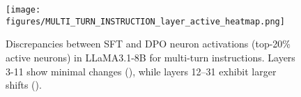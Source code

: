 
\begin{figure}[t]
    \centering
    \texttt{[image: figures/MULTI\_TURN\_INSTRUCTION\_layer\_active\_heatmap.png]}
    \vspace{-3mm}
    \caption{\small Discrepancies between SFT and DPO neuron activations (top-20\% active neurons) in LLaMA3.1-8B for multi-turn instructions. Layers 3-11 show minimal changes ({\color{lightgreen}{green}}), while layers 12--31 exhibit larger shifts ({\color{salmon}{red}}).}
    \label{fig:neuron_visual}
    \vspace{-6mm}
\end{figure}

